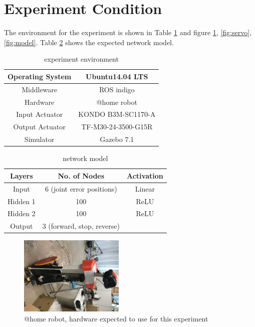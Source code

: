 \section{Experiment Condition}
The environment for the experiment is shown in Table \ref{tab:environment} and figure \ref{fig:home}, \ref{fig:servo}, \ref{fig:model}. Table \ref{tab:network} shows the expected network model.

\begin{table}[!h]
\begin{center}
\caption{experiment environment}
\label{tab:environment}
\begin{tabular}{|c|c|}
\hline
Operating System & Ubuntu14.04 LTS \\
\hline
Middleware & ROS indigo \\
\hline
Hardware & @home robot \\
\hline
Input Actuator & KONDO B3M-SC1170-A \\
\hline
Output Actuator & TF-M30-24-3500-G15R \\
\hline
Simulator & Gazebo 7.1 \\
\hline
\end{tabular}
\end{center}
\end{table}

\begin{table}[!h]
\begin{center}
\caption{network model}
\label{tab:network}
\begin{tabular}{|c|c|c|}
\hline
Layers & No. of Nodes & Activation \\
\hline
Input & 6 (joint error positions) & Linear \\
\hline
Hidden 1 & 100 & ReLU \\
\hline
Hidden 2 & 100 & ReLU \\
\hline
Output & 3 (forward, stop, reverse) &  \\
\hline
\end{tabular}
\end{center}
\end{table}

\begin{figure}[!h]
\begin{center}
\includegraphics[width=5cm]{athome.jpg}
\caption{@home robot, hardware expected to use for this experiment}
\label{fig:home}
\end{center}
\end{figure}

